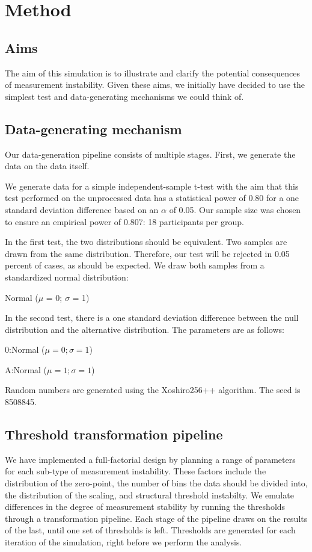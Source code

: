 \documentclass[utf8]{FrontiersinVancouver}
\begin{document}
\section{Method}


\subsection{Aims}
The aim of this simulation is to illustrate and clarify the potential consequences of measurement instability. Given these aims, we initially have decided to use the simplest test and data-generating mechanisms we could think of. 

\subsection{Data-generating mechanism}
Our data-generation pipeline consists of multiple stages. First, we generate the data on the data itself. 

We generate data for a simple independent-sample t-test with the aim that this test performed on the unprocessed data has a statistical power of 0.80 for a one standard deviation difference based on an $\alpha$ of 0.05. Our sample size was chosen to ensure an empirical power of 0.807: 18 participants per group.  

In the first test, the two distributions should be equivalent. Two samples are drawn from the same distribution. Therefore, our test will be rejected in 0.05 percent of cases, as should be expected. We draw both samples from a standardized normal distribution:

    \centerline{Normal ($\mu$ = 0; $\sigma$ = 1)}

In the second test, there is a one standard deviation difference between the null distribution and the alternative distribution. The parameters are as follows:


    \centerline{0:\@ Normal ($\mu = 0; \sigma = 1$)}
    \centerline{A:\@ Normal ($\mu = 1; \sigma = 1$)}

Random numbers are generated using the Xoshiro256++ algorithm. The seed is 8508845.

\subsection{Threshold transformation pipeline}
We have implemented a full-factorial design by planning a range of parameters for each sub-type of measurement instability. These factors include the distribution of the zero-point, the number of bins the data should be divided into, the distribution of the scaling, and structural threshold instabilty. We emulate differences in the degree of measurement stability by running the thresholds through a transformation pipeline. Each stage of the pipeline draws on the results of the last, until one set of thresholds is left. Thresholds are generated for each iteration of the simulation, right before we perform the analysis.  
\end{document}
